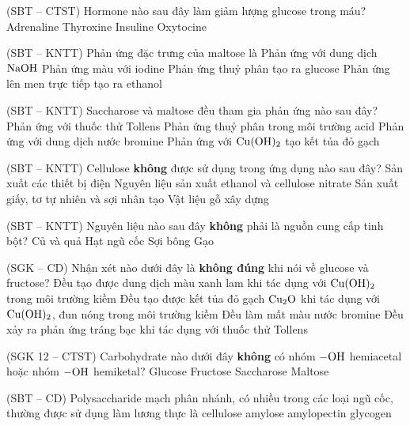\documentclass[12pt,a4paper]{article}
\begin{document}
\begin{ex}
(SBT -- CTST) Hormone nào sau đây làm giảm lượng glucose trong máu?
\choice
{Adrenaline}
{Thyroxine}
{Insuline}
{Oxytocine}
\loigiai{}
\end{ex}

\begin{ex}
(SBT -- KNTT) Phản ứng đặc trưng của maltose là
\choice
{Phản ứng với dung dịch $\ce{NaOH}$}
{Phản ứng màu với iodine}
{Phản ứng thuỷ phân tạo ra glucose}
{Phản ứng lên men trực tiếp tạo ra ethanol}
\loigiai{}
\end{ex}

\begin{ex}
(SBT -- KNTT) Saccharose và maltose đều tham gia phản ứng nào sau đây?
\choice
{Phản ứng với thuốc thử Tollens}
{Phản ứng thuỷ phân trong môi trường acid}
{Phản ứng với dung dịch nước bromine}
{Phản ứng với $\ce{Cu(OH)2}$ tạo kết tủa đỏ gạch}
\loigiai{}
\end{ex}

\begin{ex}
(SBT -- KNTT) Cellulose \textbf{không} được sử dụng trong ứng dụng nào sau đây?
\choice
{Sản xuất các thiết bị điện}
{Nguyên liệu sản xuất ethanol và cellulose nitrate}
{Sản xuất giấy, tơ tự nhiên và sợi nhân tạo}
{Vật liệu gỗ xây dựng}
\loigiai{}
\end{ex}

\begin{ex}
(SBT -- KNTT) Nguyên liệu nào sau đây \textbf{không} phải là nguồn cung cấp tinh bột?
\choice
{Củ và quả}
{Hạt ngũ cốc}
{Sợi bông}
{Gạo}
\loigiai{}
\end{ex}

\begin{ex}
(SGK -- CD) Nhận xét nào dưới đây là \textbf{không đúng} khi nói về glucose và fructose?
\choice
{Đều tạo được dung dịch màu xanh lam khi tác dụng với $\ce{Cu(OH)2}$ trong môi trường kiềm}
{Đều tạo được kết tủa đỏ gạch $\ce{Cu2O}$ khi tác dụng với $\ce{Cu(OH)2}$, đun nóng trong môi trường kiềm}
{Đều làm mất màu nước bromine}
{Đều xảy ra phản ứng tráng bạc khi tác dụng với thuốc thử Tollens}
\loigiai{}
\end{ex}

\begin{ex}
(SGK 12 -- CTST) Carbohydrate nào dưới đây \textbf{không} có nhóm $-\ce{OH}$ hemiacetal hoặc nhóm $-\ce{OH}$ hemiketal?
\choice
{Glucose}
{Fructose}
{Saccharose}
{Maltose}
\loigiai{}
\end{ex}

\begin{ex}
(SBT -- CD) Polysaccharide mạch phân nhánh, có nhiều trong các loại ngũ cốc, thường được sử dụng làm lương thực là
\choice
{cellulose}
{amylose}
{amylopectin}
{glycogen}
\loigiai{}
\end{ex}
\end{document}
